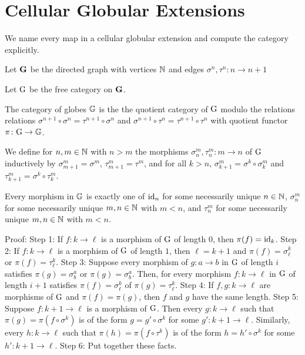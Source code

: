 \section{Cellular Globular Extensions} \label{sec: cellular globular extensions}

We name every map in a cellular globular extension and compute the category explicitly.

Let $\mathbf{G}$ be the directed graph with vertices $\mathbb{N}$ and edges $\sigma^n, \tau^n \colon n \to n + 1$

Let $\mathrm{G}$ be the free category on $\mathbf{G}$.

The category of globes $\mathbb{G}$ is the the quotient category of $\mathrm{G}$ modulo the relations relations $\sigma^{n + 1} \circ \sigma^n = \tau^{n + 1} \circ \sigma^n$ and $\sigma^{n + 1} \circ \tau^n = \tau^{n + 1} \circ \tau^n$ with quotient functor $\pi \colon \mathrm{G} \to \mathbb{G}$. 

We define for $n, m \in \mathbb{N}$ with $n > m$ the morphisms $\sigma^m_n, \tau^m_n \colon m \to n$ of $\mathrm{G}$ inductively by $\sigma^m_{m+1}= \sigma^m$, $\tau^m_{m+1} = \tau^m$, and for all $k > n$, $\sigma^m_{k + 1} = \sigma^k \circ \sigma^m_k$ and $\tau^m_{k+1} = \sigma^k \circ \tau^m_k$. 

Every morphism in $\mathbb{G}$ is exactly one of $\mathrm{id}_n$ for some necessarily unique $n \in \mathbb{N}$, $\sigma^m_n$ for some necessarily unique $m , n \in \mathbb{N}$ with $m < n$, and $\tau^m_n$ for some necessarily unique $m , n \in \mathbb{N}$ with $m < n$. 

Proof:
Step 1: If $f \colon k \to \ell$ is a morphism of $\mathrm{G}$ of length $0$, then $\pi(f) = \mathrm{id}_k$.
Step 2: If $f \colon k \to \ell$ is a morphism of $\mathrm{G}$ of length $1$, then $\ell = k+1$ and $\pi(f) = \sigma^k_{\ell}$ or $\pi(f)= \tau^k_{\ell}$.
Step 3: Suppose every morphism of $g \colon a \to b$ in $\mathrm{G}$ of length $i$ satisfies $\pi(g) = \sigma^a_b$ or $\pi(g) = \sigma^a_b$. Then, for every morphism $f \colon k \to \ell$ in $\mathrm{G}$ of length $i + 1$ satisfies $\pi(f) = \sigma^k_\ell$ of $\pi(g) = \tau^k_\ell$.
Step 4: If $f, g \colon k \to \ell$ are morphisms of $\mathrm{G}$ and $\pi(f) = \pi(g)$, then $f$ and $g$ have the same length.
Step 5: Suppose $f \colon k + 1  \to \ell$ is a morphism of $\mathrm{G}$. Then every $g \colon k \to \ell$ such that $\pi(g) = \pi(f \circ \sigma^k)$ is of the form $g = g' \circ \sigma^k$ for some $g' \colon k + 1 \to \ell$. Similarly, every $h \colon k \to \ell$ such that $\pi(h) = \pi(f \circ \tau^k)$ is of the form $h = h' \circ \sigma^k$ for some $h' \colon k + 1 \to \ell$.
Step 6: Put together these facts.

